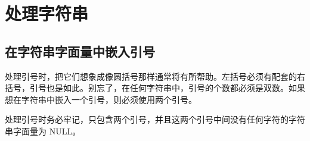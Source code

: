 \chapter{处理字符串}
\section{在字符串字面量中嵌入引号}
处理引号时，把它们想象成像圆括号那样通常将有所帮助。左括号必须有配套的右括号，引号也是如此。别忘了，在任何字符串中，引号的个数都必须是双数。如果想在字符串中嵌入一个引号，则必须使用两个引号。

处理引号时务必牢记，只包含两个引号，并且这两个引号中间没有任何字符的字符串字面量为 NULL。